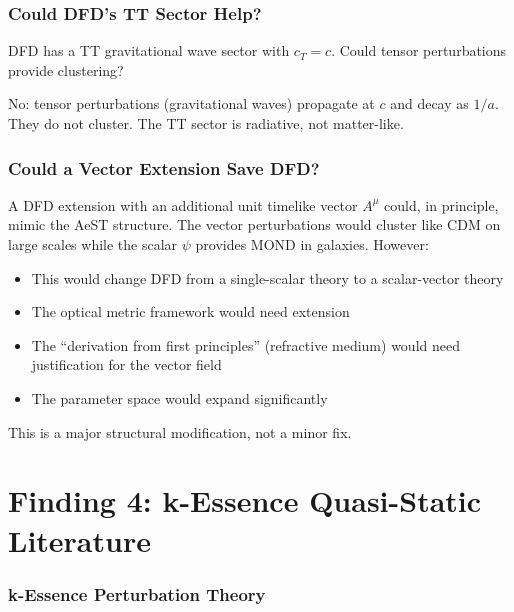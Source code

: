 \documentclass[11pt]{article}
\begin{document}
\section{Could DFD's TT Sector Help?}

DFD has a TT gravitational wave sector with $c_T = c$. Could tensor
perturbations provide clustering?

No: tensor perturbations (gravitational waves) propagate at $c$ and
decay as $1/a$. They do not cluster. The TT sector is radiative, not
matter-like.

\section{Could a Vector Extension Save DFD?}

A DFD extension with an additional unit timelike vector $A^\mu$ could,
in principle, mimic the AeST structure. The vector perturbations would
cluster like CDM on large scales while the scalar $\psi$ provides MOND
in galaxies. However:
\begin{itemize}[nosep]
\item This would change DFD from a single-scalar theory to a
  scalar-vector theory
\item The optical metric framework would need extension
\item The ``derivation from first principles'' (refractive medium)
  would need justification for the vector field
\item The parameter space would expand significantly
\end{itemize}

This is a major structural modification, not a minor fix.


\part{Finding 4: k-Essence Quasi-Static Literature}
\label{part:k-essence}

\section{k-Essence Perturbation Theory}
\end{document}
